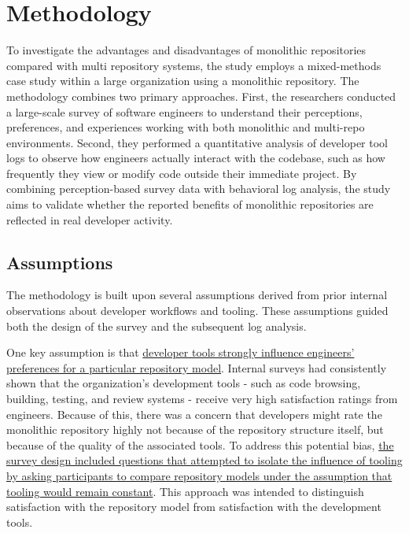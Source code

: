 \section{Methodology}
To investigate the advantages and disadvantages of monolithic repositories compared with multi repository systems, the study employs a mixed-methods case study within a large organization using a monolithic repository. The methodology combines two primary approaches. First, the researchers conducted a large-scale survey of software engineers to understand their perceptions, preferences, and experiences working with both monolithic and multi-repo environments. Second, they performed a quantitative analysis of developer tool logs to observe how engineers actually interact with the codebase, such as how frequently they view or modify code outside their immediate project. By combining perception-based survey data with behavioral log analysis, the study aims to validate whether the reported benefits of monolithic repositories are reflected in real developer activity.

\subsection{Assumptions}

The methodology is built upon several assumptions derived from prior internal observations about developer workflows and tooling. These assumptions guided both the design of the survey and the subsequent log analysis.

One key assumption is that \uline{developer tools strongly influence engineers' preferences for a particular repository model}. Internal surveys had consistently shown that the organization's development tools - such as code browsing, building, testing, and review systems - receive very high satisfaction ratings from engineers. Because of this, there was a concern that developers might rate the monolithic repository highly not because of the repository structure itself, but because of the quality of the associated tools. To address this potential bias, \uline{the survey design included questions that attempted to isolate the influence of tooling by asking participants to compare repository models under the assumption that tooling would remain constant}. This approach was intended to distinguish satisfaction with the repository model from satisfaction with the development tools.

